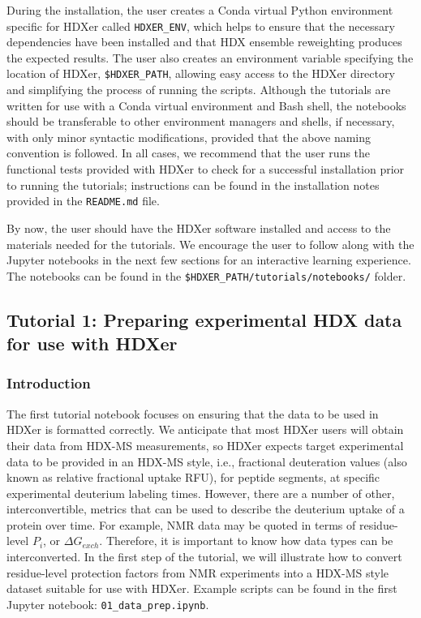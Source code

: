 \documentclass[9pt,tutorial]{livecoms}
\begin{document}
During the installation, the user creates a Conda virtual Python environment specific for HDXer called \texttt{HDXER\_ENV}, which helps to ensure that the necessary dependencies have been installed and that HDX ensemble reweighting produces the expected results. 
The user also creates an environment variable specifying the location of HDXer, \texttt{\$HDXER\_PATH}, allowing easy access to the HDXer directory and simplifying the process of running the scripts.
Although the tutorials are written for use with a Conda virtual environment and Bash shell, the notebooks should be transferable to other environment managers and shells, if necessary, with only minor syntactic modifications, provided that the above naming convention is followed. 
In all cases, we recommend that the user runs the functional tests provided with HDXer to check for a successful installation prior to running the tutorials; instructions can be found in the installation notes provided in the \texttt{README.md} file. 

By now, the user should have the HDXer software installed and access to the materials needed for the tutorials. We encourage the user to follow along with the Jupyter notebooks in the next few sections for an interactive learning experience.
The notebooks can be found in the \texttt{\$HDXER\_PATH/tutorials/notebooks/} folder.

\subsection{Tutorial 1: Preparing experimental HDX data for use with HDXer}\label{tutorial_1}

\subsubsection{Introduction}
The first tutorial notebook focuses on ensuring that the data to be used in HDXer is formatted correctly. 
We anticipate that most HDXer users will obtain their data from HDX-MS measurements, so HDXer expects target experimental data to be provided in an HDX-MS style, i.e., fractional deuteration values (also known as relative fractional uptake RFU), for peptide segments, at specific experimental deuterium labeling times. 
However, there are a number of other, interconvertible, metrics that can be used to describe the deuterium uptake of a protein over time. 
For example, NMR data may be quoted in terms of residue-level $P_i$, or $\Delta{G_{exch}}$. 
Therefore, it is important to know how data types can be interconverted. 
In the first step of the tutorial, we will illustrate how to convert residue-level protection factors from NMR experiments into a HDX-MS style dataset suitable for use with HDXer. 
Example scripts can be found in the first Jupyter notebook: \texttt{01\_data\_prep.ipynb}.
\end{document}
